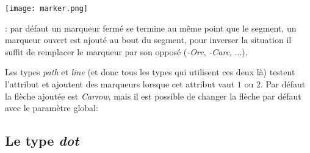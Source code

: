 \begin{center}
\begin{comment}[name=marker,file]
  view(-6,12,-15,5), Marges(0,0,0,0), size(15), col1:=-4+5.25*i, distx:=0.75, disty:=-i*0.75,
    LabelSize:=scriptsize, LabelStyle:=right, LineStyle:=dotted, Width:=6,
  Droite(col1+distx,col1+i+distx), Droite(col1+distx+1+distx,col1+i+distx+1+distx),
  Droite(col1+6+distx,col1+6+i+distx), Droite(col1+7+2*distx,col1+7+i+2*distx),
  Droite(col1+12+distx,col1+i+12+distx), Droite(col1+13+2*distx,col1+i+13+2*distx),
  Color:=black, LineStyle:=solid, k:=0,
  for z in liste do
    Inc(k,1), reste:=mod(k,3),
    pos:= if reste=1 then Inc(col1,disty), col1
       elif reste=2 then col1+6 else col1+12 fi,
    Label(pos, ["($\pm$) ",@legende(z)]), Inc(pos,distx),
    draw("line", [pos,pos+1], marker:=[0, z]), Inc(pos,1+distx),
    draw("line", [pos,pos+1], marker:=[0, -z]),
  od
  ];
\end{comment}
\ifhtml\texttt{[image: marker.png]}\else\fi%
\end{center}

\noindent{}: par défaut un marqueur fermé se termine au même point que le segment, un marqueur ouvert est ajouté au bout du segment, pour inverser la situation il suffit de remplacer le marqueur par son opposé (\emph{-Orc}, \emph{-Carc}, ...).

Les types \emph{path} et \emph{line} (et donc tous les types qui utilisent ces deux là) testent l'attribut  et ajoutent des marqueurs lorsque cet attribut vaut $1$ ou $2$. Par défaut la flèche ajoutée est \emph{Carrow}, mais il est possible de changer la flèche par défaut avec le paramètre global:\par
{\centering {}\par}

\subsection{Le type \emph{dot}}\label{typedot}

{\centering {}\par}

